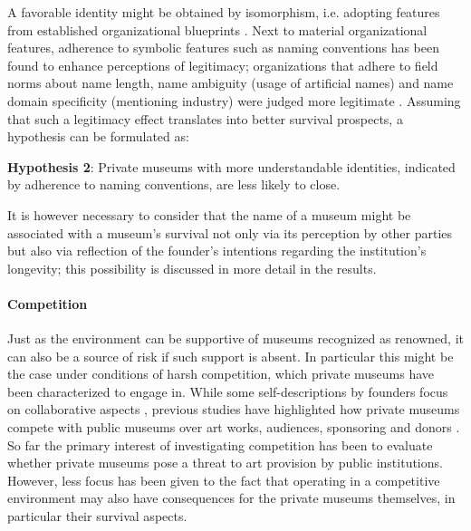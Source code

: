 \documentclass[12pt]{article}
\begin{document}
A favorable identity might be obtained by isomorphism, i.e. adopting features from established organizational blueprints \parencite{diMaggio_1983_iron}.
Next to material organizational features, adherence to symbolic features such as naming conventions has been found to enhance perceptions of legitimacy; organizations that adhere to field norms about name length, name ambiguity (usage of artificial names) and name domain specificity (mentioning industry) were judged more legitimate \parencite{Glynn_Abzug_2002_names}.
Assuming that such a legitimacy effect translates into better survival prospects, a hypothesis can be formulated as:


\bigbreak
\noindent
\textbf{Hypothesis 2}: Private museums with more understandable identities, indicated by adherence to naming conventions, are less likely to close. 


It is however necessary to consider that the name of a museum might be associated with a museum's survival not only via its perception by other parties but also via reflection of the founder's intentions regarding the institution's longevity; this possibility is discussed in more detail in the results.
\paragraph*{Competition}




Just as the environment can be supportive of museums recognized as renowned, it can also be a source of risk if such support is absent.
In particular this might be the case under conditions of harsh competition, which private museums have been characterized to engage in.
While some self-descriptions by founders focus on collaborative aspects \parencite{Duron_2020_rebaudengo,BMW_2016_salsali}, previous studies have highlighted how private museums compete with public museums over art works, audiences, sponsoring and donors \parencite[p.4]{Kolbe_etal_2022_privatemuseum}. 
So far the primary interest of investigating competition has been to evaluate whether private museums pose a threat to art provision by public institutions.
However, less focus has been given to the fact that operating in a competitive environment may also have consequences for the private museums themselves, in particular their survival aspects.
\end{document}

